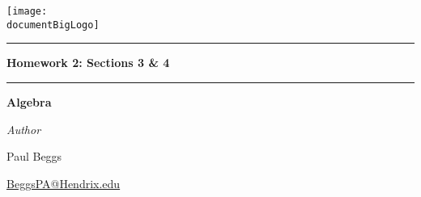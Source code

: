 \documentclass[12pt, oneside]{book}
\newcommand{\documentBigLogo}{../../images/logo_white_text.png}
\newcounter{BoxCounter}
\begin{document}



\newcommand{\assignmentname}{Homework 2: Sections 3 \& 4}

\newcommand{\cussubtitle}{Algebra}
\newcommand{\finaldate}{Septemeber 11, 2025}
\newcommand{\professor}{Dr. Christopher Camfield, Ph.D.}




\begin{titlepage}
    \begin{center}

        \vspace*{-2cm}
        \texttt{[image: \\documentBigLogo]}\\
        \vfill

        \textcolor{horange}{\rule{\textwidth}{1.0pt}}

        \vspace{2em}

        {\huge \textbf{\assignmentname}}

        \vspace{1em} %

        \textcolor{horange}{\rule{\textwidth}{1.0pt}}

        \vspace*{1\baselineskip}

        {\LARGE \textbf{\cussubtitle}}

        \begin{large}
            \vspace*{5\baselineskip}

            \vspace*{1\baselineskip}

            \emph{Author} \\[1ex]
            {\Large Paul Beggs \\ \par} %
            {\href{mailto:BeggsPA@Hendrix.edu}{{BeggsPA@Hendrix.edu}}}\\ %


\end{large}
\end{center}
\end{titlepage}
\end{document}
